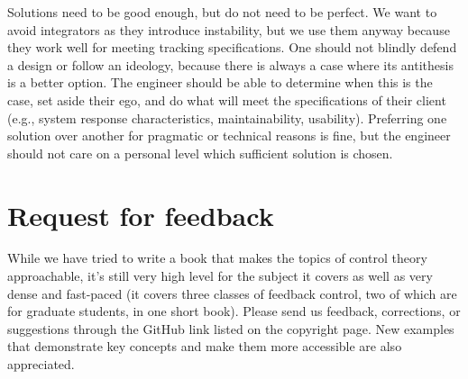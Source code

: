 Solutions need to be good enough, but do not need to be perfect. We want to
avoid integrators as they introduce instability, but we use them anyway because
they work well for meeting tracking specifications. One should not blindly
defend a design or follow an ideology, because there is always a case where its
antithesis is a better option. The engineer should be able to determine when
this is the case, set aside their ego, and do what will meet the specifications
of their client (e.g., system response characteristics, maintainability,
usability). Preferring one solution over another for pragmatic or technical
reasons is fine, but the engineer should not care on a personal level which
sufficient solution is chosen.

\section{Request for feedback}

While we have tried to write a book that makes the topics of control theory
approachable, it's still very high level for the subject it covers as well as
very dense and fast-paced (it covers three classes of feedback control, two of
which are for graduate students, in one short book). Please send us feedback,
corrections, or suggestions through the GitHub link listed on the copyright
page. New examples that demonstrate key concepts and make them more accessible
are also appreciated.
